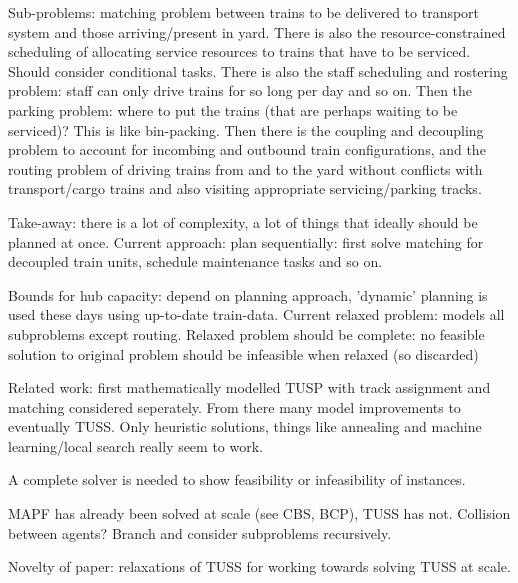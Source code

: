 \documentclass[a4paper,10pt,english]{article}
\begin{document}
	Sub-problems: matching problem between trains to be delivered to transport system and those arriving/present in yard. There is also the resource-constrained scheduling of allocating service resources to trains that have to be serviced. Should consider conditional tasks. There is also the staff scheduling and rostering problem: staff can only drive trains for so long per day and so on. Then the parking problem: where to put the trains (that are perhaps waiting to be serviced)? This is like bin-packing. Then there is the coupling and decoupling problem to account for incombing and outbound train configurations, and the routing problem of driving trains from and to the yard without conflicts with transport/cargo trains and also visiting appropriate servicing/parking tracks.
	
	Take-away: there is a lot of complexity, a lot of things that ideally should be planned at once. Current approach: plan sequentially: first solve matching for decoupled train units, schedule maintenance tasks and so on.
	
	
	Bounds for hub capacity: depend on planning approach, 'dynamic' planning is used these days using up-to-date train-data. Current relaxed problem: models all subproblems except routing. Relaxed problem should be complete: no feasible solution to original problem should be infeasible when relaxed (so discarded)
	
	Related work: \cite{Freling2002} first mathematically modelled TUSP with track assignment and matching considered seperately. From there many model improvements to eventually TUSS. Only heuristic solutions, things like annealing and machine learning/local search really seem to work. 
	
	A complete solver is needed to show feasibility or infeasibility of instances.
	
	MAPF has already been solved at scale (see CBS, BCP), TUSS has not. Collision between agents? Branch and consider subproblems recursively.
	
	Novelty of paper: relaxations of TUSS for working towards solving TUSS at scale.
\end{document}
